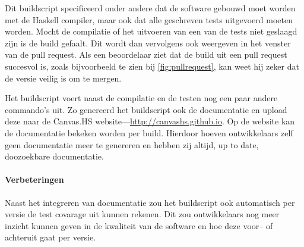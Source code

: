 Dit buildscript specificeerd onder andere dat de software gebouwd moet worden met de Haskell compiler, maar ook dat alle geschreven tests uitgevoerd moeten worden. Mocht de compilatie of het uitvoeren van een van de tests niet geslaagd zijn is de build gefaalt. Dit wordt dan vervolgens ook weergeven in het venster van de pull request. Als een beoordelaar ziet dat de build uit een pull request succesvol is, zoals bijvoorbeeld te zien bij \autoref{fig:pullrequest}, kan weet hij zeker dat de versie veilig is om te mergen.

Het buildscript voert naast de compilatie en de testen nog een paar andere commando's uit. Zo genereerd het buildscript ook de documentatie en upload deze naar de Canvas.HS website—\url{http://canvashs.github.io}. Op de website kan de documentatie bekeken worden per build. Hierdoor hoeven ontwikkelaars zelf geen documentatie meer te genereren en hebben zij altijd, up to date, doozoekbare documentatie.

\paragraph{Verbeteringen} Naast het integreren van documentatie zou het buildscript ook automatisch per versie de test covarage uit kunnen rekenen. Dit zou ontwikkelaars nog meer inzicht kunnen geven in de kwaliteit van de software en hoe deze voor– of achteruit gaat per versie.

